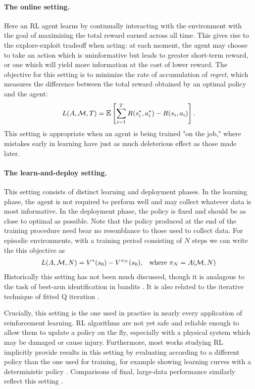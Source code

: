 \paragraph{The online setting.}
Here an RL agent learns by continually interacting with the environment with the goal of maximizing the total reward earned across all time.
This gives rise to the explore-exploit tradeoff when acting: at each moment, the agent may choose to take an action which is uninformative but leads to greater short-term reward, or one which will yield more information at the cost of lower reward.
The objective for this setting is to minimize the rate of accumulation of \emph{regret}, which measures the difference between the total reward obtained by an optimal policy and the agent:
\begin{align}
    L(A, \mdp, T) = \E \left[ \sum_{i=1}^T R(s^*_i, a^*_i) - R(s_i, a_i) \right].
\end{align}
This setting is appropriate when an agent is being trained "on the job," where mistakes early in learning have just as much deleterious effect as those made later.


\paragraph{The learn-and-deploy setting.}
This setting consists of distinct learning and deployment phases.
In the learning phase, the agent is not required to perform well and may collect whatever data is most informative.
In the deployment phase, the policy is fixed and should be as close to optimal as possible.
Note that the policy produced at the end of the training procedure need bear no resemblance to those used to collect data.
For episodic environments, with a training period consisting of $N$ steps we can write the this objective as
\begin{align}
    L(A, \mathcal{M}, N) = V^*(s_0) - V^{\pi_N}(s_0), && \text{where } \pi_N = A(\mathcal{M}, N)
\end{align}
Historically this setting has not been much discussed, though it is analagous to the task of best-arm identification in bandits \citep{Russo2016SimpleBA,Kaufmann2016OnTC}.
It is also related to the iterative technique of fitted Q iteration \citep{Ernst2005TreeBasedBM,Riedmiller2005NeuralFQ}.

Crucially, this setting is the one used in practice in nearly every application of reinforcement learning.
RL algorithms are not yet safe and reliable enough to allow them to update a policy on the fly, especially with a physical system which may be damaged or cause injury.
Furthermore, most works studying RL implicitly provide results in this setting by evaluating according to a different policy than the one used for training, for example showing learning curves with a deterministic policy \citep{Mnih2015HumanlevelCT,Lillicrap2016ContinuousCW,Fujimoto2018AddressingFA,haarnoja2018softA}.
Comparisons of final, large-data performance similarly reflect this setting \citep{Silver2016MasteringTG,Vinyals2019GrandmasterLI,openai2019dota,OpenAI2019SolvingRC}.


